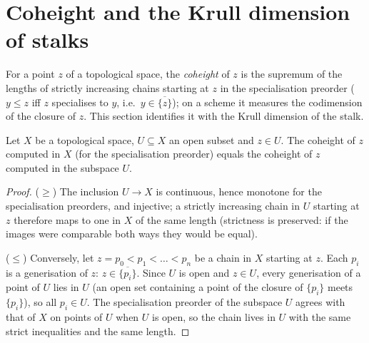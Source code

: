 \section{Coheight and the Krull dimension of stalks}
\label{sec:coheight_stalk}

For a point \(z\) of a topological space, the \emph{coheight} of \(z\) is the supremum
of the lengths of strictly increasing chains starting at \(z\) in the specialisation
preorder (\(y \leq z\) iff \(z\) specialises to \(y\), i.e.\ \(y \in \overline{\{z\}}\));
on a scheme it measures the codimension of the closure of \(z\). This section identifies
it with the Krull dimension of the stalk.

\begin{lemma}
  \label{lem:coheight_open_embedding}
  \leanok
  Let \(X\) be a topological space, \(U \subseteq X\) an open subset and \(z \in U\).
  The coheight of \(z\) computed in \(X\) (for the specialisation preorder) equals the
  coheight of \(z\) computed in the subspace \(U\).
\end{lemma}
\begin{proof}
  \leanok
  (\(\geq\)) The inclusion \(U \to X\) is continuous, hence monotone for the
  specialisation preorders, and injective; a strictly increasing chain in \(U\) starting
  at \(z\) therefore maps to one in \(X\) of the same length (strictness is preserved:
  if the images were comparable both ways they would be equal).

  (\(\leq\)) Conversely, let \(z = p_0 < p_1 < \dots < p_n\) be a chain in \(X\)
  starting at \(z\). Each \(p_i\) is a generisation of \(z\): \(z \in
  \overline{\{p_i\}}\). Since \(U\) is open and \(z \in U\), every generisation of a
  point of \(U\) lies in \(U\) (an open set containing a point of the closure of
  \(\{p_i\}\) meets \(\{p_i\}\)), so all \(p_i \in U\). The specialisation preorder of
  the subspace \(U\) agrees with that of \(X\) on points of \(U\) when \(U\) is open, so
  the chain lives in \(U\) with the same strict inequalities and the same length.
\end{proof}

